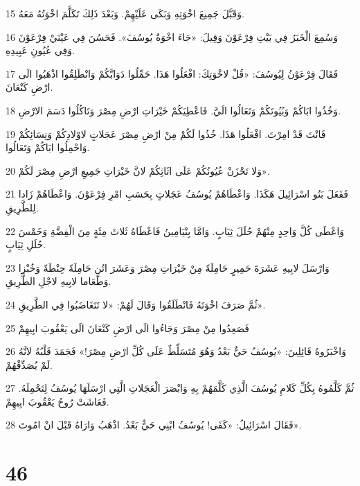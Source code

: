 \par 15 وَقَبَّلَ جَمِيعَ اخْوَتِهِ وَبَكَى عَلَيْهِمْ. وَبَعْدَ ذَلِكَ تَكَلَّمَ اخْوَتُهُ مَعَهُ.
\par 16 وَسُمِعَ الْخَبَرُ فِي بَيْتِ فِرْعَوْنَ وَقِيلَ: «جَاءَ اخْوَةُ يُوسُفَ». فَحَسُنَ فِي عَيْنَيْ فِرْعَوْنَ وَفِي عُيُونِ عَبِيدِهِ.
\par 17 فَقَالَ فِرْعَوْنُ لِيُوسُفَ: «قُلْ لاخْوَتِكَ: افْعَلُوا هَذَا. حَمِّلُوا دَوَابَّكُمْ وَانْطَلِقُوا اذْهَبُوا الَى ارْضِ كَنْعَانَ.
\par 18 وَخُذُوا ابَاكُمْ وَبُيُوتَكُمْ وَتَعَالُوا الَيَّ. فَاعْطِيَكُمْ خَيْرَاتِ ارْضِ مِصْرَ وَتَاكُلُوا دَسَمَ الارْضِ.
\par 19 فَانْتَ قَدْ امِرْتَ. افْعَلُوا هَذَا. خُذُوا لَكُمْ مِنْ ارْضِ مِصْرَ عَجَلاتٍ لاوْلادِكُمْ وَنِسَائِكُمْ وَاحْمِلُوا ابَاكُمْ وَتَعَالُوا.
\par 20 وَلا تَحْزَنْ عُيُونُكُمْ عَلَى اثَاثِكُمْ لانَّ خَيْرَاتِ جَمِيعِ ارْضِ مِصْرَ لَكُمْ».
\par 21 فَفَعَلَ بَنُو اسْرَائِيلَ هَكَذَا. وَاعْطَاهُمْ يُوسُفُ عَجَلاتٍ بِحَسَبِ امْرِ فِرْعَوْنَ. وَاعْطَاهُمْ زَادا لِلطَّرِيقِ.
\par 22 وَاعْطَى كُلَّ وَاحِدٍ مِنْهُمْ حُلَلَ ثِيَابٍ. وَامَّا بِنْيَامِينُ فَاعْطَاهُ ثَلاثَ مِئَةٍ مِنَ الْفِضَّةِ وَخَمْسَ حُلَلِ ثِيَابٍ.
\par 23 وَارْسَلَ لابِيهِ عَشَرَةَ حَمِيرٍ حَامِلَةً مِنْ خَيْرَاتِ مِصْرَ وَعَشَرَ اتُنٍ حَامِلَةً حِنْطَةً وَخُبْزا وَطَعَاما لابِيهِ لاجْلِ الطَّرِيقِ.
\par 24 ثُمَّ صَرَفَ اخْوَتَهُ فَانْطَلَقُوا وَقَالَ لَهُمْ: «لا تَتَغَاضَبُوا فِي الطَّرِيقِ».
\par 25 فَصَعِدُوا مِنْ مِصْرَ وَجَاءُوا الَى ارْضِ كَنْعَانَ الَى يَعْقُوبَ ابِيهِمْ
\par 26 وَاخْبَرُوهُ قَائِلِينَ: «يُوسُفُ حَيٌّ بَعْدُ وَهُوَ مُتَسَلِّطٌ عَلَى كُلِّ ارْضِ مِصْرَ!» فَجَمَدَ قَلْبُهُ لانَّهُ لَمْ يُصَدِّقْهُمْ.
\par 27 ثُمَّ كَلَّمُوهُ بِكُلِّ كَلامِ يُوسُفَ الَّذِي كَلَّمَهُمْ بِهِ وَابْصَرَ الْعَجَلاتِ الَّتِي ارْسَلَهَا يُوسُفُ لِتَحْمِلَهُ. فَعَاشَتْ رُوحُ يَعْقُوبَ ابِيهِمْ.
\par 28 فَقَالَ اسْرَائِيلُ: «كَفَى! يُوسُفُ ابْنِي حَيٌّ بَعْدُ. اذْهَبُ وَارَاهُ قَبْلَ انْ امُوتَ».

\chapter{46}

